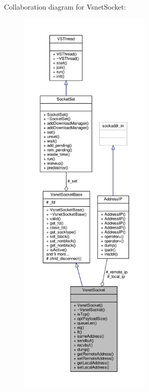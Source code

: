 Collaboration diagram for Vsnet\+Socket\+:
\nopagebreak
\begin{figure}[H]
\begin{center}
\leavevmode
\includegraphics[height=550pt]{d0/d33/classVsnetSocket__coll__graph}
\end{center}
\end{figure}
